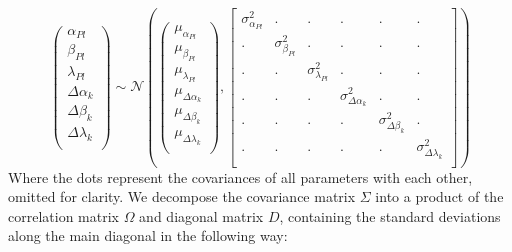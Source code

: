 \documentclass{article}
\begin{document}
\[
\begin{pmatrix}
\alpha_{Pl} \\ 
\beta_{Pl} \\ 
\lambda_{Pl} \\ 
\Delta\alpha_{k} \\ 
\Delta\beta_{k} \\ 
\Delta\lambda_{k} \\ 
\end{pmatrix}
\sim
\mathcal{N}
\left(
\begin{pmatrix}
\mu_{\alpha_{Pl}} \\ 
\mu_{\beta_{Pl}} \\ 
\mu_{\lambda_{Pl}} \\ 
\mu_{\Delta\alpha_{k}} \\ 
\mu_{\Delta\beta_{k}} \\ 
\mu_{\Delta\lambda_{k}} \\ 
\end{pmatrix},
\begin{bmatrix}
\sigma_{\alpha_{Pl}}^2 & . & . & . & . & .\\
. & \sigma_{\beta_{Pl}}^2 & . & . & . & . \\
. & . & \sigma_{\lambda_{Pl}}^2 &  . & . & . \\
. & . & . & \sigma_{\Delta\alpha_{k}}^2 & . & . \\
. & . & . & . & \sigma_{\Delta\beta_{k}}^2 & . \\
. & . & . & . & . & \sigma_{\Delta\lambda_{k}}^2\\

\end{bmatrix}
\right)
\]
Where the dots represent the covariances of all parameters with each other, omitted for clarity. We decompose the covariance matrix $\Sigma$ into a product of the correlation matrix $\Omega$ and diagonal matrix $D$, containing the standard deviations along the main diagonal in the following way:%
\end{document}
